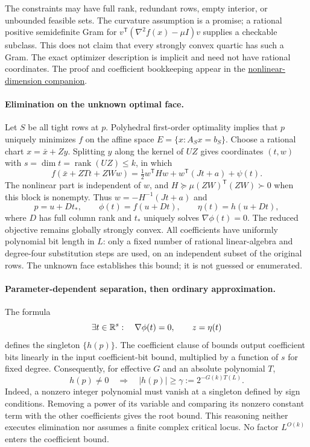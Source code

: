 The constraints may have full rank, redundant rows, empty interior, or
unbounded feasible sets. The curvature assumption is a promise; a rational
positive semidefinite Gram for
$v^{\mathsf T}(\nabla^2f(x)-\mu I)v$ supplies a checkable subclass.
This does not claim that every strongly convex quartic has such a Gram.
The exact optimizer description is implicit and need not have rational
coordinates. The proof and coefficient bookkeeping appear in the
\href{../constrained-exact/theorem.md}{nonlinear-dimension companion}.

\paragraph{Elimination on the unknown optimal face.}
Let $S$ be all tight rows at $p$. Polyhedral first-order optimality
implies that $p$ uniquely minimizes $f$ on the affine space
$E=\{x:A_Sx=b_S\}$. Choose a rational chart $x=\bar x+Zy$.
Splitting $y$ along the kernel of $UZ$ gives coordinates $(t,w)$ with
$s=\dim t=\operatorname{rank}(UZ)\le k$, in which
\begin{equation}
 f(\bar x+ZTt+ZWw)
 =\tfrac12 w^{\mathsf T}Hw+w^{\mathsf T}(Jt+a)+\psi(t).
 \label{eq:quadratic-directions}
\end{equation}
The nonlinear part is independent of $w$, and
$H\succeq\mu(ZW)^{\mathsf T}(ZW)\succ0$ when this block is nonempty.
Thus $w=-H^{-1}(Jt+a)$ and
\[
 p=u+Dt_*,\qquad
 \phi(t)=f(u+Dt),\qquad \eta(t)=h(u+Dt),
\]
where $D$ has full column rank and $t_*$ uniquely solves
$\nabla\phi(t)=0$. The reduced objective remains globally strongly
convex. All coefficients have uniformly polynomial bit length in $L$:
only a fixed number of rational linear-algebra and degree-four substitution
steps are used, on an independent subset of the original rows.
The unknown face establishes this bound; it is not guessed or enumerated.

\paragraph{Parameter-dependent separation, then ordinary approximation.}
The formula
\[
 \exists t\in\mathbb R^s:\quad \nabla\phi(t)=0,\qquad z=\eta(t)
\]
defines the singleton $\{h(p)\}$. The coefficient clause of
\citet[Theorem~2.27]{Basu2014}
bounds output coefficient bits linearly in the input coefficient-bit
bound, multiplied by a function of $s$ for fixed degree. Consequently,
for effective $G$ and an absolute polynomial $T$,
\begin{equation}
 h(p)\ne0\quad\Longrightarrow\quad
 |h(p)|\ge\gamma:=2^{-G(k)T(L)}.
 \label{eq:nonlinear-dimension-gap}
\end{equation}
Indeed, a nonzero integer polynomial must vanish at a singleton defined
by sign conditions. Removing a power of its variable and comparing its
nonzero constant term with the other coefficients gives the root bound.
This reasoning neither executes elimination nor assumes a finite complex
critical locus. No factor $L^{O(k)}$ enters the coefficient bound.

